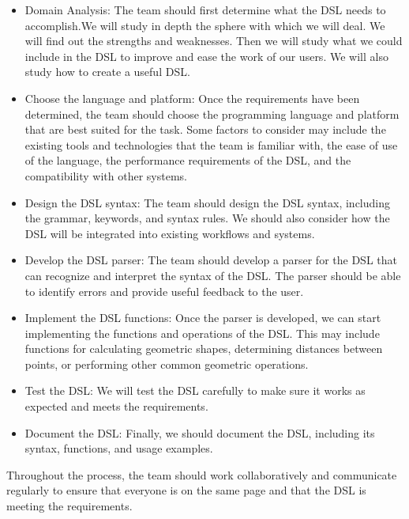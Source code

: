 \begin{itemize}

\item Domain Analysis: The team should first determine what the DSL needs to accomplish.We will study in depth the sphere with which we will deal. We will find out the strengths and weaknesses. Then we will study what we could include in the DSL to improve and ease the work of our users. We will also study how to create a useful DSL.

\item Choose the language and platform: Once the requirements have been determined, the team should choose the programming language and platform that are best suited for the task. Some factors to consider may include the existing tools and technologies that the team is familiar with, the ease of use of the language, the performance requirements of the DSL, and the compatibility with other systems.

\item Design the DSL syntax: The team should design the DSL syntax, including the grammar, keywords, and syntax rules. We should also consider how the DSL will be integrated into existing workflows and systems.

\item Develop the DSL parser: The team should develop a parser for the DSL that can recognize and interpret the syntax of the DSL. The parser should be able to identify errors and provide useful feedback to the user.

\item Implement the DSL functions: Once the parser is developed, we can start implementing the functions and operations of the DSL. This may include functions for calculating geometric shapes, determining distances between points, or performing other common geometric operations.

\item Test the DSL: We will test the DSL carefully to make sure it works as expected and meets the requirements.

\item Document the DSL: Finally, we should document the DSL, including its syntax, functions, and usage examples.

\end{itemize}

Throughout the process, the team should work collaboratively and communicate regularly to ensure that everyone is on the same page and that the DSL is meeting the requirements.


